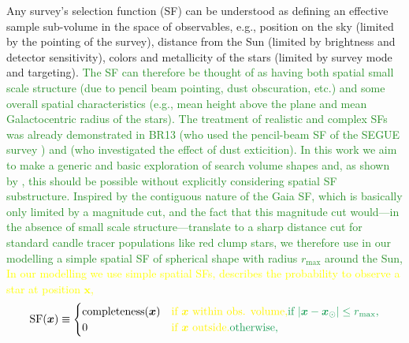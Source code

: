 \documentclass[iop,revtex4,numberedappendix,appendixfloats]{emulateapj}
\newcommand{\vect}[1]{\boldsymbol{#1}}
\newcommand{\NEW}[1]{\textcolor{ForestGreen}{#1}}
\newcommand{\OLD}[1]{\textcolor{Yellow}{#1}}%
\begin{document}
Any survey's selection function (SF) can be understood as defining an effective sample sub-volume in the space of observables, e.g., position on the sky (limited by the pointing of the survey), distance from the Sun (limited by brightness and detector sensitivity), colors and metallicity of the stars (limited by survey mode and targeting). \NEW{The SF can therefore be thought of as having both spatial small scale structure (due to pencil beam pointing, dust obscuration, etc.) and some overall spatial characteristics (e.g., mean height above the plane and mean Galactocentric radius of the stars). The treatment of realistic and complex SFs was already demonstrated in BR13 (who used the pencil-beam SF of the SEGUE survey \citep{2012ApJ...753..148B}) and \citet{2016ApJ...818..130B} (who investigated the effect of dust exticition). In this work we aim to make a generic and basic exploration of search volume shapes and, as shown by \citet{2016ApJ...818..130B}, this should be possible without explicitly considering spatial SF substructure. Inspired by the contiguous nature of the Gaia SF, which is basically only limited by a magnitude cut, and the fact that this magnitude cut would---in the absence of small scale structure---translate to a sharp distance cut for standard candle tracer populations like red clump stars, we therefore use in our modelling a simple spatial SF of spherical shape with radius $r_\text{max}$ around the Sun,} \OLD{In our modelling we use simple spatial SFs, describes the probability to observe a star at position $\vect{x}$,}
\begin{eqnarray}
\text{SF}(\vect{x}) \equiv \begin{cases}
\text{completeness}(\vect{x}) &\text{\OLD{if $\vect{x}$ within obs. volume,}\NEW{if $|\vect{x}-\vect{x}_\odot| \leq r_\text{max}$,}}\\
0 & \text{\OLD{if $\vect{x}$ outside.}\NEW{otherwise,}}
\end{cases} \label{eq:selectionfunction}
\end{eqnarray}
\end{document}
